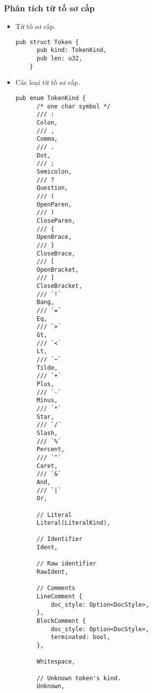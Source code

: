 {\subsubsection{Phân tích từ tố sơ cấp}
\begin{itemize}
  \item \label{ap1:simple_token}Từ tố sơ cấp. %
  \begin{lstlisting}[]
    pub struct Token {
      pub kind: TokenKind,
      pub len: u32,
    }
  \end{lstlisting}
  \item \label{ap1:simple_token_kind}Các loại từ tố sơ cấp. %
  \begin{lstlisting}[]
    pub enum TokenKind {
      /* one char symbol */
      /// :
      Colon,
      /// ,
      Comma,
      /// .
      Dot,
      /// ;
      Semicolon,
      /// ?
      Question,
      /// (
      OpenParen,
      /// )
      CloseParen,
      /// {
      OpenBrace,
      /// }
      CloseBrace,
      /// [
      OpenBracket,
      /// ]
      CloseBracket,
      /// `!`
      Bang,
      /// `=`
      Eq,
      /// `>`
      Gt,
      /// `<`
      Lt,
      /// `~`
      Tilde,
      /// `+`
      Plus,
      /// `-`
      Minus,
      /// `*`
      Star,
      /// `/`
      Slash,
      /// `%`
      Percent,
      /// `^`
      Caret,
      /// `&`
      And,
      /// `|`
      Or,

      // Literal
      Literal(LiteralKind),

      // Identifier
      Ident,

      // Raw identifier
      RawIdent,

      // Comments
      LineComment {
          doc_style: Option<DocStyle>,
      },
      BlockComment {
          doc_style: Option<DocStyle>,
          terminated: bool,
      },

      Whitespace,

      // Unknown token's kind.
      Unknown,


\end{lstlisting}
\end{itemize}}
